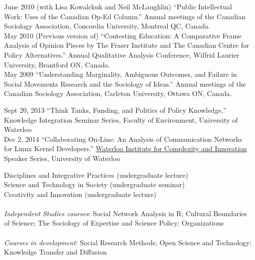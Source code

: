 \documentclass[9pt,usenames,dvipsnames]{article}
\begin{document}
\ind June 2010 (with Lisa Kowalchuk and Neil McLaughlin) ``Public Intellectual Work: Uses of the Canadian Op-Ed Column.'' Annual meetings of the Canadian Sociology Association, Concordia University, Montreal QC, Canada.\\

\ind May 2010 (Previous version of) ``Contesting Education: A Comparative Frame Analysis of Opinion Pieces by The Fraser Institute and The Canadian Centre for Policy Alternatives.'' Annual Qualitative Analysis Conference, Wilfrid Laurier University, Brantford ON, Canada.\\

\ind May 2009 ``Understanding Marginality, Ambiguous Outcomes, and Failure in Social Movements Research and the Sociology of Ideas.'' Annual meetings of the Canadian Sociology Association, Carleton University, Ottawa ON, Canada.\\


\ind Sept 20, 2013 ``Think Tanks, Funding, and Politics of Policy Knowledge,'' Knowledge Integration Seminar Series, Faculty of Environment, University of Waterloo \\

\ind Dec 2, 2014 ``Collaborating On-Line: An Analysis of Communication Networks for Linux Kernel Developers.'' \href{http://wici.ca/}{Waterloo Institute for Complexity and Innovation} Speaker Series, University of Waterloo \\



\noindent Disciplines and Integrative Practices (undergraduate lecture) \\
\noindent Science and Technology in Society (undergraduate seminar) \\
\noindent Creativity and Innovation (undergraduate lecture) \\ 
\\
\noindent \emph{Independent Studies courses}: Social Network Analysis in R; Cultural Boundaries of Science; The Sociology of Expertise and Science Policy; Organizations \\ %
\\
\noindent \emph{Courses in development}: Social Research Methods; Open Science and Technology; Knowledge Transfer and Diffusion \\

\bigskip
{}
\end{document}

